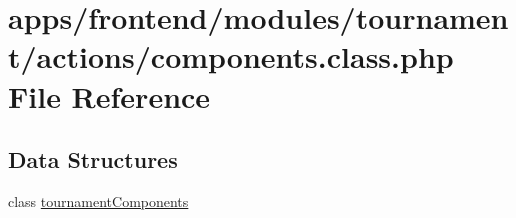 \hypertarget{frontend_2modules_2tournament_2actions_2components_8class_8php}{\section{apps/frontend/modules/tournament/actions/components.class.\-php File Reference}
\label{frontend_2modules_2tournament_2actions_2components_8class_8php}
}
\subsection*{Data Structures}
\begin{DoxyCompactItemize}
\item 
class \hyperlink{classtournament_components}{tournament\-Components}
\end{DoxyCompactItemize}
